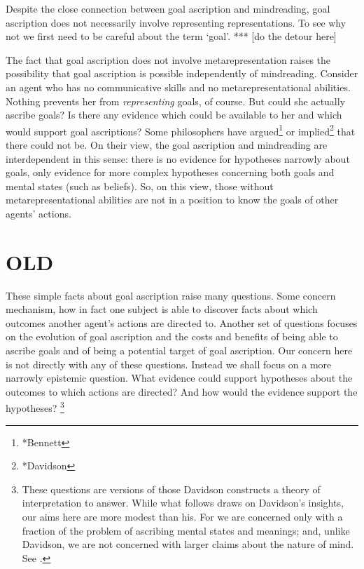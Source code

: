 \documentclass[12pt,a4paper]{extarticle}
\begin{document}
Despite the close connection between goal ascription and mindreading,
goal ascription does not necessarily involve representing representations.
To see why not we first need to be careful about the term `goal'.
***
[do the detour here]

The fact that goal ascription does not involve metarepresentation raises the possibility that goal ascription is possible independently of mindreading.
Consider an agent who has no communicative skills and no metarepresentational abilities.
Nothing prevents her from \emph{representing} goals, of course.
But could she actually ascribe goals?
Is there any evidence which could be available to her and which would support goal ascriptions?
Some philosophers have argued\footnote{*Bennett} or implied\footnote{*Davidson} that there could not be.
On their view, the goal ascription and mindreading are interdependent in this sense: 
there is no evidence for hypotheses narrowly about goals, only evidence for more complex hypotheses concerning both goals and mental states (such as beliefs).
So, on this view, those without metarepresentational abilities are not in a position to know the goals of other agents' actions.





\section{OLD}

These simple facts about goal ascription raise many questions.
Some concern mechanism, how in fact one subject is able to discover facts about which outcomes another agent's actions are directed to.
Another set of questions focuses on the evolution of goal ascription and the costs and benefits of being able to ascribe goals and of being a potential target of goal ascription.
Our concern here is not directly with any of these questions.
Instead we shall focus on a more narrowly epistemic question.
What evidence could support hypotheses about the outcomes to which actions are directed?
And how would the evidence support the hypotheses?%
\footnote{
These questions are versions of those Davidson constructs a theory of interpretation to answer.
While what follows draws  on Davidson's insights,
our aims here are more modest than his.
For we are concerned only with a  fraction of the problem of ascribing mental states and meanings;
and, unlike Davidson, we are not concerned with larger claims about the nature of mind.
See
\citet{Davidson:1973jx,Davidson:1990du,lepore_donald_2005}.
}
\end{document}
